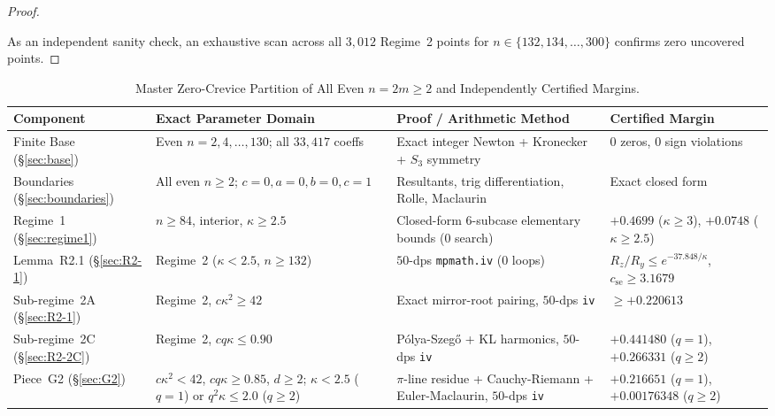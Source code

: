 \documentclass[10pt]{article}
\numberwithin{equation}{section}
\theoremstyle{plain}
\theoremstyle{definition}
\newcommand{\1}{\mathbf{1}}
\newcommand{\code}[1]{\texttt{#1}}
\begin{document}
\begin{proof}
\begin{enumerate}[label=(\arabic*)]
\begin{itemize}[leftmargin=1.5em]
    \end{itemize}
\end{enumerate}
As an independent sanity check, an exhaustive scan across all $3{,}012$ Regime~2 points for $n \in \{132, 134, \dots, 300\}$ confirms zero uncovered points.
\end{proof}

\begin{table}[htbp]
\centering
\caption{Master Zero-Crevice Partition of All Even $n = 2m \ge 2$ and Independently Certified Margins.}
\label{tab:partition}
\footnotesize
\begin{tabularx}{\textwidth}{@{} >{\raggedright\arraybackslash}p{2.35cm} >{\raggedright\arraybackslash}X >{\raggedright\arraybackslash}p{3.45cm} >{\raggedright\arraybackslash}p{2.65cm} @{}}
\toprule
\textbf{Component} & \textbf{Exact Parameter Domain} & \textbf{Proof / Arithmetic Method} & \textbf{Certified Margin} \\
\midrule
Finite Base (\S\ref{sec:base}) & Even $n = 2, 4, \dots, 130$; all $33{,}417$ coeffs & Exact integer Newton + Kronecker + $S_3$ symmetry & $0$ zeros, $0$ sign violations \\
\addlinespace[2pt]
Boundaries (\S\ref{sec:boundaries}) & All even $n \ge 2$; $c=0, a=0, b=0, c=1$ & Resultants, trig differentiation, Rolle, Maclaurin & Exact closed form \\
\addlinespace[2pt]
Regime~1 (\S\ref{sec:regime1}) & $n \ge 84$, interior, $\kappa \ge 2.5$ & Closed-form 6-subcase elementary bounds (0 search) & $+0.4699$ ($\kappa \ge 3$), $+0.0748$ ($\kappa \ge 2.5$) \\
\addlinespace[2pt]
Lemma~R2.1 (\S\ref{sec:R2-1}) & Regime~2 ($\kappa < 2.5$, $n \ge 132$) & $50$-dps \code{mpmath.iv} (0 loops) & $R_z/R_y \le e^{-37.848/\kappa}$, $c_{\mathrm{se}} \ge 3.1679$ \\
\addlinespace[2pt]
Sub-regime~2A (\S\ref{sec:R2-1}) & Regime~2, $c\kappa^2 \ge 42$ & Exact mirror-root pairing, $50$-dps \code{iv} & $\ge +0.220613$ \\
\addlinespace[2pt]
Sub-regime~2C (\S\ref{sec:R2-2C}) & Regime~2, $c q \kappa \le 0.90$ & P\'olya-Szeg\H{o} + KL harmonics, $50$-dps \code{iv} & $+0.441480$ ($q=1$), $+0.266331$ ($q\ge 2$) \\
\addlinespace[2pt]
Piece~G2 (\S\ref{sec:G2}) & $c\kappa^2 < 42$, $c q \kappa \ge 0.85$, $d \ge 2$; $\kappa < 2.5$ ($q=1$) or $q^2\kappa \le 2.0$ ($q \ge 2$) & $\pi$-line residue + Cauchy-Riemann + Euler-Maclaurin, $50$-dps \code{iv} & $+0.216651$ ($q=1$), $+0.00176348$ ($q \ge 2$) \\

\end{tabularx}
\end{table}
\end{document}
